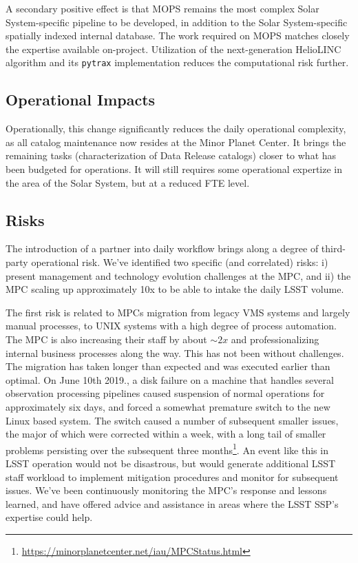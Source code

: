 \documentclass[DM,authoryear,toc]{lsstdoc}
\begin{document}
A secondary positive effect is that MOPS remains the most complex Solar System-specific pipeline to be developed, in addition to the Solar System-specific spatially indexed internal database. The work required on MOPS matches closely the expertise available on-project. Utilization of the next-generation HelioLINC algorithm and its {\tt pytrax} implementation reduces the computational risk further.

\subsection{Operational Impacts}

Operationally, this change significantly reduces the daily operational complexity, as all catalog maintenance now resides at the Minor Planet Center. It brings the remaining tasks (characterization of Data Release catalogs) closer to what has been budgeted for operations. It will still requires some operational expertize in the area of the Solar System, but at a reduced FTE level.

\subsection{Risks}

The introduction of a partner into daily workflow brings along a degree of third-party operational risk. We've identified two specific (and correlated) risks: i) present management and technology evolution challenges at the MPC, and ii) the MPC scaling up approximately 10x to be able to intake the daily LSST volume.

The first risk is related to MPCs migration from legacy VMS systems and largely manual processes, to UNIX systems with a high degree of process automation. The MPC is also increasing their staff by about $\sim 2x$ and professionalizing internal business processes along the way. This has not been without challenges. The migration has taken longer than expected and was executed earlier than optimal. On June 10th 2019., a disk failure on a machine that handles several observation processing pipelines caused suspension of normal operations for approximately six days, and forced a somewhat premature switch to the new Linux based system. The switch caused a number of subsequent smaller issues, the major of which were corrected within a week, with a long tail of smaller problems persisting over the subsequent three months\footnote{\url{https://minorplanetcenter.net/iau/MPCStatus.html}}. An event like this in LSST operation would not be disastrous, but would generate additional LSST staff workload to implement mitigation procedures and monitor for subsequent issues. We've been continuously monitoring the MPC's response and lessons learned, and have offered advice and assistance in areas where the LSST SSP's expertise could help.
\end{document}
